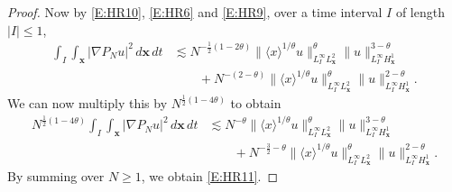\documentclass[12pt,letterpaper]{amsart}
\newcommand{\la}{\langle}
\newcommand{\ra}{\rangle}
\theoremstyle{remark}
\numberwithin{equation}{section}
\numberwithin{theorem}{section}
\numberwithin{table}{section}
\begin{document}
\begin{proof}
Now by \eqref{E:HR10}, \eqref{E:HR6} and \eqref{E:HR9}, over a time interval $I$ of length $|I|\leq 1$, 
$$
\begin{aligned}
\int_I \int_{\mathbf{x}} |\nabla P_N u|^2 \, d\mathbf{x}\, dt 
&\lesssim   N^{-\frac12(1 - 2\theta)} \| \la x\ra^{1/\theta} u \|_{L_I^\infty L_{\mathbf{x}}^2}^\theta  \| u \|_{L_I^\infty H_{\mathbf{x}}^1}^{3-\theta}\\
& \qquad +N^{-(2-\theta)} \|\la x \ra^{1/\theta} u \|_{L_I^\infty L_{\mathbf{x}}^2}^\theta \| u \|_{L_I^\infty H_{\mathbf{x}}^1}^{2-\theta}.
\end{aligned}
$$
We can now multiply this by $N^{\frac12(1-4\theta)}$ to obtain
$$
\begin{aligned}
N^{\frac12(1-4\theta)}\int_I \int_{\mathbf{x}} |\nabla P_N u|^2 \, d\mathbf{x}\, dt 
&\lesssim   N^{-\theta} \| \la x\ra^{1/\theta} u \|_{L_I^\infty L_{\mathbf{x}}^2}^\theta  \| u \|_{L_I^\infty H_{\mathbf{x}}^1}^{3-\theta}\\
& \qquad +N^{-\frac32-\theta} \|\la x \ra^{1/\theta} u \|_{L_I^\infty L_{\mathbf{x}}^2}^\theta \| u \|_{L_I^\infty H_{\mathbf{x}}^1}^{2-\theta}.
\end{aligned}
$$
By summing over $N\geq 1$, we obtain \eqref{E:HR11}.
\end{proof}
\end{document}
